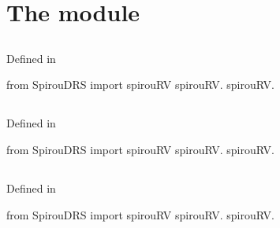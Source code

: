 
\clearpage
\newpage
\begin{minipage}{\textwidth}
\section{The  module}
\label{ch:the_module:}

\subsection{}

Defined in \spirouRV{}

\begin{pythonbox}
from SpirouDRS import spirouRV
spirouRV.
spirouRV.
\end{pythonbox}

\begin{pythondocstring}

\end{pythondocstring}
\end{minipage}

\begin{minipage}{\textwidth}
\subsection{}

Defined in \spirouRV{}

\begin{pythonbox}
from SpirouDRS import spirouRV
spirouRV.
spirouRV.
\end{pythonbox}

\begin{pythondocstring}

\end{pythondocstring}
\end{minipage}

\begin{minipage}{\textwidth}
\subsection{}

Defined in \spirouRV{}

\begin{pythonbox}
from SpirouDRS import spirouRV
spirouRV.
spirouRV.
\end{pythonbox}

\begin{pythondocstring}

\end{pythondocstring}
\end{minipage}

